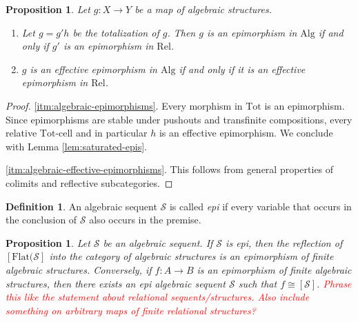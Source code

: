 \documentclass[a4paper]{article}
\newcommand{\todo}[1]{\textcolor{red}{#1}}
\newtheorem{proposition}[theorem]{Proposition}
\theoremstyle{remark}
\theoremstyle{definition}
\newtheorem{definition}[theorem]{Definition}
\begin{document}
\begin{proposition}
  \label{prop:algebraic-epis}
  Let $g : X \rightarrow Y$ be a map of algebraic structures.
  \begin{enumerate}
    \item
      \label{itm:algebraic-epimorphisms}
      Let $g = g' h$ be the totalization of $g$.
      Then $g$ is an epimorphism in $\mathrm{Alg}$ if and only if $g'$ is an epimorphism in $\mathrm{Rel}$.
    \item
      \label{itm:algebraic-effective-epimorphisms}
      $g$ is an effective epimorphism in $\mathrm{Alg}$ if and only if it is an effective epimorphism in $\mathrm{Rel}$.
  \end{enumerate}
\end{proposition}
\begin{proof}
  \ref{itm:algebraic-epimorphisms}.
  Every morphism in $\mathrm{Tot}$ is an epimorphism.
  Since epimorphisms are stable under pushouts and transfinite compositions, every relative $\mathrm{Tot}$-cell and in particular $h$ is an effective epimorphism.
  We conclude with Lemma \ref{lem:saturated-epis}.

  \ref{itm:algebraic-effective-epimorphisms}.
  This follows from general properties of colimits and reflective subcategories.
\end{proof}

\begin{definition}
  An algebraic sequent $\mathcal{S}$ is called \emph{epi} if every variable that occurs in the conclusion of $\mathcal{S}$ also occurs in the premise.
\end{definition}

\begin{proposition}
  Let $\mathcal{S}$ be an algebraic sequent.
  If $\mathcal{S}$ is epi, then the reflection of $[\mathrm{Flat}(\mathcal{S}]$ into the category of algebraic structures is an epimorphism of finite algebraic structures.
  Conversely, if $f : A \rightarrow B$ is an epimorphism of finite algebraic structures, then there exists an epi algebraic sequent $\mathcal{S}$ such that $f \cong [\mathcal{S}]$.
  \todo{Phrase this like the statement about relational sequents/structures.}
  \todo{Also include something on arbitrary maps of finite relational structures?}
\end{proposition}
\end{document}
